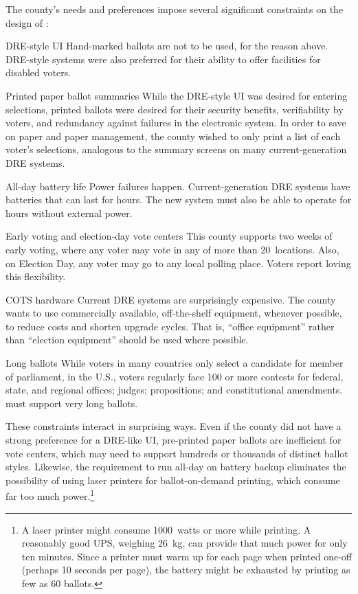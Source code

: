 The county's needs and preferences 
impose several significant constraints on the design of \projname:
\begin{compactdesc}
\item[DRE-style UI] 
    Hand-marked ballots are not to be used, for the reason above.
    DRE-style
    systems were also preferred for their ability to offer facilities for
    disabled voters.

\item[Printed paper ballot summaries]
    While the DRE-style UI was
    desired for entering selections, printed ballots were desired for their
    security benefits, verifiability by voters, and redundancy against failures in the
    electronic system. In order to save on paper and paper management, the county wished to
    only print a list of each voter's selections, analogous to the
    summary screens on many current-generation DRE systems.

\item[All-day battery life]
    Power failures happen. Current-generation DRE systems have
    batteries that can last for hours. The new system must also be
    able to operate for hours without external power.

\item[Early voting and election-day vote centers]
    This county supports two weeks of early voting, where any voter
    may vote in any of more than 20~locations. Also,
    on Election Day, any voter may go to any local polling
    place. Voters report loving this flexibility.

\item[COTS hardware]
    Current DRE systems are surprisingly expensive. The county wants
    to use commercially available, off-the-shelf equipment, whenever
    possible, to reduce costs and shorten upgrade cycles.
    That is, ``office equipment''  rather than ``election
    equipment'' should be used where possible.

\item[Long ballots]
    While voters in many countries only select a candidate for member
    of parliament, in the U.S., voters regularly face
    100 or more contests for federal, state, and regional
    offices; judges; propositions;
    and constitutional amendments. \projname must support very long
    ballots.
\end{compactdesc}

These constraints interact in surprising ways. 
Even if the county did not have a strong preference for a DRE-like UI, 
pre-printed paper
ballots are inefficient for vote centers, which may
need to support hundreds or thousands of distinct ballot
styles. Likewise, the requirement to run all-day on battery backup
eliminates the possibility of using laser printers for
ballot-on-demand printing, which consume far too
much power.\footnote{%
   A laser printer might consume 1000~watts or more
  while printing. A reasonably good UPS, weighing 26~kg, can provide
  that much power for only ten minutes. Since a printer must 
  warm up for each page when printed one-off (perhaps 10
  seconds per page), the battery might be exhausted by printing
  as few as 60 ballots.
 }

